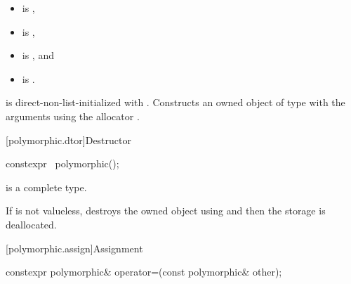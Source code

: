 \begin{itemdescr}
\pnum
\constraints

\begin{itemize}
\item
{} is ,
\item
{} is ,
\item
{} is , and
\item
{} is .
\end{itemize}

\pnum
\effects
{} is direct-non-list-initialized with .
Constructs an owned object of type  with the arguments
using the allocator .
\end{itemdescr}

[polymorphic.dtor]{Destructor}

%
\begin{itemdecl}
constexpr ~polymorphic();
\end{itemdecl}

\begin{itemdescr}
\pnum
\mandates
{} is a complete type.

\pnum
\effects
If  is not valueless,
destroys the owned object using  and
then the storage is deallocated.
\end{itemdescr}

[polymorphic.assign]{Assignment}

%
%
\begin{itemdecl}
constexpr polymorphic& operator=(const polymorphic& other);
\end{itemdecl}

